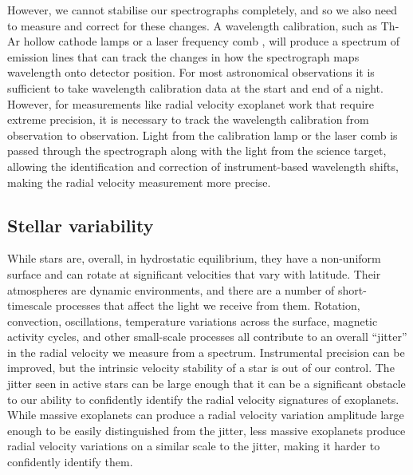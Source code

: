 However, we cannot stabilise our spectrographs completely, and so we also need to measure and correct for these changes. A wavelength calibration, such as Th-Ar hollow cathode lamps \citep{2007Murphy} or a laser frequency comb \citep{1999Reichert}, will produce a spectrum of emission lines that can track the changes in how the spectrograph maps wavelength onto detector position. For most astronomical observations it is sufficient to take wavelength calibration data at the start and end of a night. However, for measurements like radial velocity exoplanet work that require extreme precision, it is necessary to track the wavelength calibration from observation to observation. Light from the calibration lamp or the laser comb is passed through the spectrograph along with the light from the science target, allowing the identification and correction of instrument-based wavelength shifts, making the radial velocity measurement more precise.\\

\subsection{Stellar variability}
\label{secVariability}
While stars are, overall, in hydrostatic equilibrium, they have a non-uniform surface and can rotate at significant velocities that vary with latitude. Their atmospheres are dynamic environments, and there are a number of short-timescale processes that affect the light we receive from them. Rotation, convection, oscillations, temperature variations across the surface, magnetic activity cycles, and other small-scale processes all contribute to an overall ``jitter'' in the radial velocity we measure from a spectrum. Instrumental precision can be improved, but the intrinsic velocity stability of a star is out of our control. The jitter seen in active stars can be large enough that it can be a significant obstacle to our ability to confidently identify the radial velocity signatures of exoplanets. While massive exoplanets can produce a radial velocity variation amplitude large enough to be easily distinguished from the jitter, less massive exoplanets produce radial velocity variations on a similar scale to the jitter, making it harder to confidently identify them.\\

